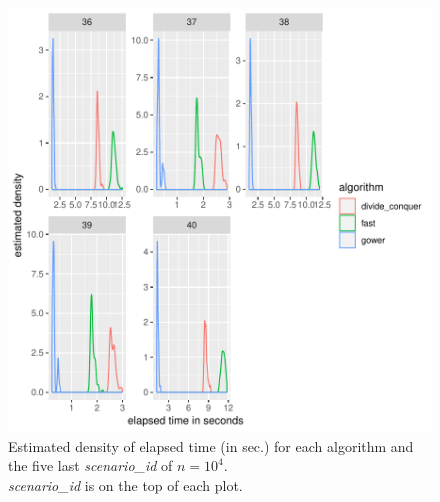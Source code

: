 \documentclass[11pt]{report}
\begin{document}
\begin{figure}[h]
\centering
    \includegraphics[scale=2]{./images/elapsed_time_10000_part2.pdf}
    \caption{
    Estimated density of elapsed time (in sec.) for each algorithm and the five 
    last \textit{scenario\_id} of $n=10^4$.\\
    \textit{scenario\_id} is on the top of each plot.
    }
\end{figure}

\FloatBarrier
\end{document}

